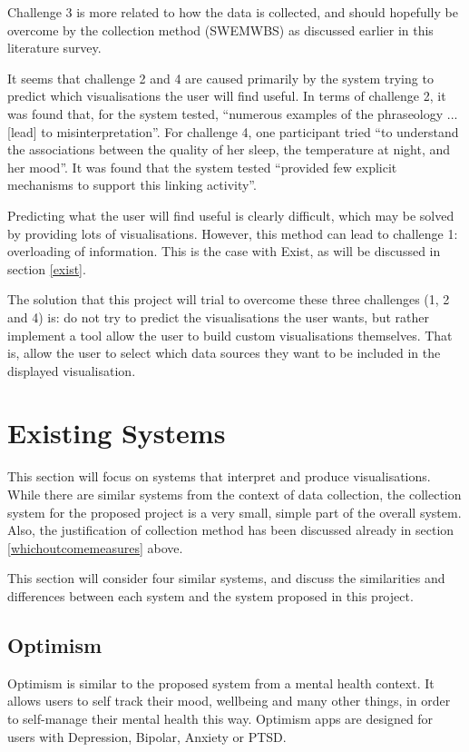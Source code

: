 \documentclass[11pt,openright,a4paper]{report}
\begin{document}
Challenge 3 is more related to how the data is collected, and should hopefully be overcome by the collection method (SWEMWBS) as discussed earlier in this literature survey.

It seems that challenge 2 and 4 are caused primarily by the system trying to predict which visualisations the user will find useful. In terms of challenge 2, it was found that, for the system tested, \enquote{numerous examples of the phraseology ... [lead] to misinterpretation}. For challenge 4, one participant tried \enquote{to understand the associations between the quality of her sleep, the temperature at night, and her mood}. It was found that the system tested \enquote{provided few explicit mechanisms to support this linking activity}.

Predicting what the user will find useful is clearly difficult, which may be solved by providing lots of visualisations. However, this method can lead to challenge 1: overloading of information. This is the case with Exist, as will be discussed in section \ref{exist}.

The solution that this project will trial to overcome these three challenges (1, 2 and 4) is: do not try to predict the visualisations the user wants, but rather implement a tool allow the user to build custom visualisations themselves. That is, allow the user to select which data sources they want to be included in the displayed visualisation.

\section{Existing Systems} \label{existingsystems}
This section will focus on systems that interpret and produce visualisations. While there are similar systems from the context of data collection, the collection system for the proposed project is a very small, simple part of the overall system. Also, the justification of collection method has been discussed already in section \ref{whichoutcomemeasures} above.

This section will consider four similar systems, and discuss the similarities and differences between each system and the system proposed in this project.

\subsection{Optimism}
Optimism \parencite{optimism} is similar to the proposed system from a mental health context. It allows users to self track their mood, wellbeing and many other things, in order to self-manage their mental health this way. Optimism apps are designed for users with Depression, Bipolar, Anxiety or PTSD.
\end{document}

